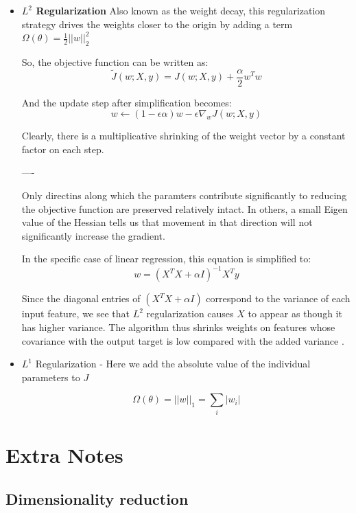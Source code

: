 \documentclass{article}
\begin{document}
\begin{itemize}
    \item \textbf{$L^2$ Regularization} Also known as the weight decay, this regularization strategy drives the weights closer to the origin by adding a term $ \Omega(\theta) = \frac{1}{2} || w ||^2_2$
    
    So, the objective function can be written as:
    $$ \tilde{J}(w; X, y) = J(w; X, y) + \frac{\alpha}{2}w^Tw $$
    
    And the update step after simplification becomes:
    $$ w \leftarrow (1 - \epsilon\alpha)w - \epsilon \nabla_wJ(w; X,y) $$
    
    Clearly, there is a multiplicative shrinking of the weight vector by a constant factor on each step.
    
    ----
    
    Only directins along which the paramters contribute significantly to reducing the objective function are preserved relatively intact. In others, a small Eigen value of the Hessian tells us that movement in that direction will not significantly increase the gradient.
    
    In the specific case of linear regression, this equation is simplified to:
    $$ w = (X^TX + \alpha I) ^{-1} X^T y $$
    
    Since the diagonal entries of $ (X^TX + \alpha I)$ correspond to the variance of each input feature, we see that $L^2$ regularization causes $X$ to appear as though it has higher variance. The algorithm thus shrinks weights on features whose covariance with the output target is low compared with the added variance .
    
    \item{$L^1$ Regularization} - Here we add the absolute value of the individual parameters to $J$
    
    $$ \Omega(\theta) = ||w||_1 = \sum_i|w_i| $$
    
    
    
\end{itemize}

\section{Extra Notes}

\subsection{Dimensionality reduction}
\end{document}
